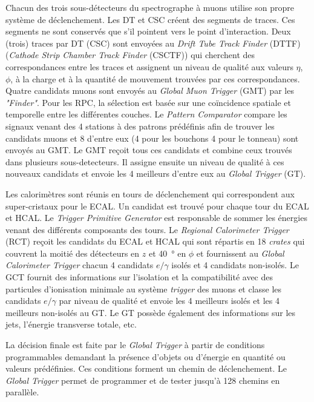 Chacun des trois sous-détecteurs du spectrographe à muons utilise son propre système de déclenchement. Les DT et CSC créent des segments de traces. Ces segments ne sont conservés que s'il pointent vers le point d'interaction. Deux (trois) traces par DT (CSC) sont envoyées au \textit{Drift Tube Track Finder} (DTTF) (\textit{Cathode Strip Chamber Track Finder }(CSCTF)) qui cherchent des correspondances entre les traces et assignent un niveau de qualité aux valeurs $\eta$, $\phi$, à la charge et à la quantité de mouvement trouvées par ces correspondances. Quatre candidats muons sont envoyés au \textit{Global Muon Trigger} (GMT) par les \textit{"Finder"}. Pour les RPC, la sélection est basée sur une coïncidence spatiale et temporelle entre les différentes couches. Le \textit{Pattern Comparator} compare les signaux venant des \num{4} stations à des patrons prédéfinis afin de trouver les candidats muons et \num{8} d'entre eux (\num{4} pour les bouchons \num{4} pour le tonneau) sont envoyés au GMT. Le GMT reçoit tous ces candidats et combine ceux trouvés dans plusieurs sous-detecteurs. Il assigne ensuite un niveau de qualité à ces nouveaux candidats et envoie les \num{4} meilleurs d'entre eux au \textit{Global Trigger} (GT).

Les calorimètres sont réunis en tours de déclenchement qui correspondent aux super-cristaux pour le ECAL. Un candidat est trouvé pour chaque tour du ECAL et HCAL. Le \textit{Trigger Primitive Generator} est responsable de sommer les énergies venant des différents composants des tours.  Le \textit{Regional Calorimeter Trigger} (RCT) reçoit les candidats du ECAL et HCAL qui sont répartis en \num{18} \textit{crates} qui couvrent la moitié des détecteurs en $z$ et \SI{40}{\degree} en $\phi$ et fournissent au \textit{Global Calorimeter Trigger} chacun \num{4} candidats $e/\gamma$ isolés et \num{4} candidats non-isolés. Le GCT fournit des informations sur l'isolation et la compatibilité avec des particules d'ionisation minimale au système \textit{trigger} des muons et classe les candidats $e/\gamma$ par niveau de qualité et envoie les \num{4} meilleurs isolés et les \num{4} meilleurs non-isolés au GT. Le GT possède également des informations sur les jets, l'énergie transverse totale, etc.

La décision finale est faite par le \textit{Global Trigger} à partir de conditions programmables demandant la présence d'objets ou d'énergie en quantité ou valeurs prédéfinies. Ces conditions forment un chemin de déclenchement. Le \textit{Global Trigger} permet de programmer et de tester jusqu'à \num{128} chemins en parallèle. 

